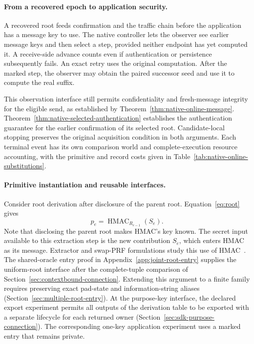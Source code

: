 \paragraph{From a recovered epoch to application security.}
A recovered root feeds confirmation and the traffic chain before the
application has a message key to use. The native controller lets the
observer see earlier message keys and then select a step, provided
neither endpoint has yet computed it. A receive-side advance counts
even if authentication or persistence subsequently fails. An exact
retry uses the original computation. After the marked step, the
observer may obtain the paired successor seed and use it to compute
the real suffix.

This observation interface still permits confidentiality and
fresh-message integrity for the eligible send, as established by
Theorem~\ref{thm:native-online-message}.
Theorem~\ref{thm:native-selected-authentication} establishes the
authentication guarantee for the earlier confirmation of its selected
root. Candidate-local stopping preserves the original acquisition
condition in both arguments. Each terminal event has its own comparison
world and complete-execution resource accounting, with the primitive
and record costs given in Table~\ref{tab:native-online-substitutions}.

\paragraph{Primitive instantiation and reusable interfaces.}
Consider root derivation after disclosure of the parent root.
Equation~\eqref{eq:root} gives
\[
 p_e=\operatorname{HMAC}_{R_{e-1}}(S_e).
\]
Note that disclosing the parent root makes HMAC's key known. The secret
input available to this extraction step is the new contribution $S_e$,
which enters HMAC as its message. Extractor and swap-PRF formulations
study this use of HMAC~\cite{hmacswap2023,rfc5869}.
The shared-oracle entry proof in Appendix~\ref{app:joint-root-entry}
supplies the uniform-root interface after the complete-tuple comparison
of Section~\ref{sec:contextbound-connection}. Extending this argument
to a finite family requires preserving exact pad-state and
information-string aliases (Section~\ref{sec:multiple-root-entry}).
At the purpose-key interface, the declared export experiment permits
all outputs of the derivation table to be exported with a separate
lifecycle for each returned owner
(Section~\ref{sec:sdk-purpose-connection}). The corresponding one-key
application experiment uses a marked entry that remains private.

